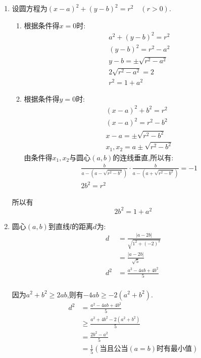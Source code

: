 \begin{questions}
	\begin{solution}
		\begin{enumerate}[label=(\arabic*)]
			\item 设圆方程为$(x-a)^2 + (y-b)^2 = r^2\quad(r>0)$.
			      \begin{enumerate}[label=\Roman*]
				      \item 根据条件得$x=0$时:
				            \begin{align*}
					            a^2 + (y-b)^2 = r^2      \\
					            (y-b)^2 = r^2- a^2       \\
					            y- b = \pm\sqrt{r^2-a^2} \\
					            2\sqrt{r^2-a^2} = 2      \\
					            r^2 = 1 + a^2
				            \end{align*}
				      \item 根据条件得$y=0$时:
				            \begin{align*}
					            (x-a)^2 + b^2 = r^2     \\
					            (x-a)^2 = r^2-b^2       \\
					            x-a = \pm\sqrt{r^2-b^2} \\
					            x_1, x_2 = a \pm\sqrt{r^2-b^2}
				            \end{align*}
				            由条件得$x_1,x_2$与圆心$(a,b)$的连线垂直,所以有:
				            \begin{align*}
					            \frac{b}{a-(a-\sqrt{r^2-b^2})}\cdot\frac{b}{a-(a+\sqrt{r^2 - b^2})} = -1 \\
					            2b^2 = r^2
				            \end{align*}
			      \end{enumerate}
			      所以有
			      \begin{equation*}
				      2b^2=1+a^2 \tag{a}
			      \end{equation*}
			\item 圆心$(a,b)$到直线$l$的距离$d$为:
			      \begin{align*}
				      d   & = \frac{|a - 2b|}{\sqrt{1^2 + (-2)^2}} \\
				          & = \frac{|a-2b|}{\sqrt{5}}              \\
				      d^2 & = \frac{a^2 - 4ab + 4b^2}{5}           \\
			      \end{align*}

			      因为$a^2 + b^2 \geqslant 2ab$,则有$-4ab \geqslant -2(a^2+b^2)$.
			      \begin{align*}
				      d^2 & = \frac{a^2 - 4ab + 4b^2}{5}              \\
				          & \geqslant \frac{a^2 +4b^2 -2(a^2+b^2)}{5} \\
				          & = \frac{2b^2 - a^2}{5}                    \\
				          & = \frac{1}{5} (\text{当且公当}(a=b)时有最小值)
			      \end{align*}


\end{enumerate}
\end{solution}
\end{questions}
